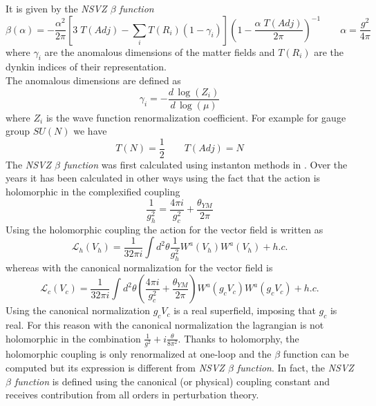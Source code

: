 It is given by the \emph{NSVZ $\beta$ function} 
\begin{equation}
  \beta (\alpha) = - \frac{\alpha^2}{2 \pi} \left[ 3 \; T(Adj) - \sum_i T( R_i) ( 1 - \gamma_i ) \right]  \left( 1 - \frac{ \alpha \; T(Adj)  }{2 \pi} \right)^{-1} \qquad \alpha = \frac{g^2}{4 \pi}
\label{beta-exact}
\end{equation} 
where $\gamma_i$ are the anomalous dimensions of the matter fields and $T(R_i)$ are the dynkin indices of their representation.\\
The anomalous dimensions are defined as
\begin{equation}
 \gamma_i = - \frac{d \, \log(Z_i) }{d \, \log( \mu)}
\end{equation}
where $Z_i$ is the wave function renormalization coefficient.
For example for gauge group $SU(N)$ we have
\begin{equation*}
 T(N) = \frac{1}{2} \qquad T(Adj) = N 
\end{equation*}
The \emph{NSVZ $\beta$ function} was first calculated using instanton methods in \cite{Novikov:1985rd}. 
Over the years it has been calculated in other ways using the fact that the action is holomorphic in the complexified coupling
\begin{equation}
	\frac{1}{g_h^2} = \frac{4 \pi i }{g_c^2 } + \frac{\theta_{YM}}{2 \pi} 
\end{equation}
Using the holomorphic coupling the action for the vector field is written as
\begin{equation}
 \mathcal{L}_h ( V_h) = \frac{1}{32 \pi i } \int d^2 \theta \frac{1}{g_h^2} W^a ( V_h) W^a(V_h)  + h.c.
\end{equation}
whereas with the canonical normalization for the vector field is
\begin{equation}
 \mathcal{L}_c ( V_c) = \frac{1}{32 \pi i } \int d^2 \theta \left( \frac{4 \pi i }{g_c^2 } + \frac{\theta_{YM}}{2 \pi} \right) W^a ( g_c V_c) W^a(g_c V_c) + h. c.  
\end{equation}
Using the canonical normalization $g_c V_c$ is a real superfield, imposing that $g_c$ is real.
For this reason with the canonical normalization the lagrangian is not holomorphic in the combination $ \frac{1}{g^2 } + i \frac{\theta}{8 \pi^2} $.
Thanks to holomorphy, the holomorphic coupling is only renormalized at one-loop and the $\beta$ function can be computed but its expression is different from \emph{NSVZ $\beta$ function}.
In fact, the \emph{NSVZ $\beta$ function} is defined using the canonical (or physical) coupling constant and receives contribution from all orders in perturbation theory.

